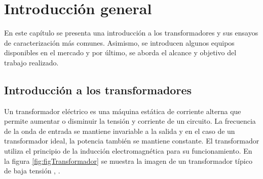 
\chapter{Introducción general} %

\label{Chapter1} %
\label{IntroGeneral}


\newcommand{\keyword}[1]{\textbf{#1}}
\newcommand{\tabhead}[1]{\textbf{#1}}
\newcommand{\code}[1]{\texttt{#1}}
\newcommand{\file}[1]{\texttt{\bfseries#1}}
\newcommand{\option}[1]{\texttt{\itshape#1}}
\newcommand{\grados}{$^{\circ}$}

En este capítulo se presenta una introducción a los transformadores y sus ensayos de caracterización más comunes. Asimismo, se introducen algunos equipos disponibles en el mercado y por último, se aborda el alcance y objetivo del trabajo realizado.



\section{Introducción a los transformadores}

Un transformador eléctrico es una máquina estática de corriente alterna que permite aumentar o disminuir la tensión y corriente de un circuito. La frecuencia de la onda de entrada se mantiene invariable a la salida y en el caso de un transformador ideal, la potencia también se mantiene constante. El transformador utiliza el principio de la inducción electromagnética para su funcionamiento. En la figura \ref{fig:figTransformador} se muestra la imagen de un transformador típico de baja tensión \citep{TRAFO_WIKI}, \citep{TRAFO_2}.


